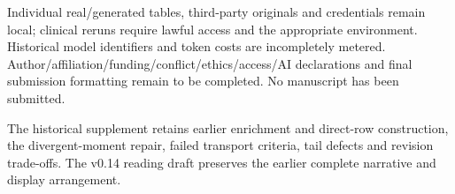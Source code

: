 \documentclass[10pt,twocolumn]{article}
\begin{document}
Individual real/generated tables, third-party originals and credentials remain local; clinical reruns require lawful access and the appropriate environment. Historical model identifiers and token costs are incompletely metered. Author/affiliation/funding/conflict/ethics/access/AI declarations and final submission formatting remain to be completed. No manuscript has been submitted.


The historical supplement retains earlier enrichment and direct-row construction, the divergent-moment repair, failed transport criteria, tail defects and revision trade-offs. The v0.14 reading draft preserves the earlier complete narrative and display arrangement.
\end{document}
